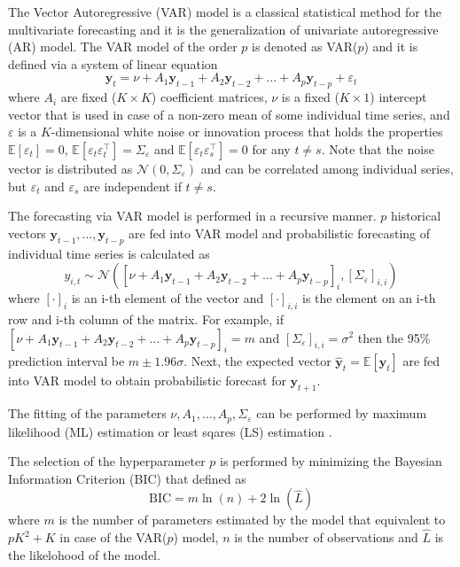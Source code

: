 \documentclass[12pt,a4paper]{article}
\begin{document}
The Vector Autoregressive (VAR) model is a classical statistical method for the multivariate forecasting \cite{mts2007} and it is the generalization of univariate autoregressive (AR) model. The VAR model of the order $p$ is denoted as VAR($p$) and it is defined via a system of linear equation
$$\mathbf y_{t} = \nu + A_1 \mathbf y_{t-1} + A_2 \mathbf y_{t-2} + \dots + A_p \mathbf y_{t-p} + \varepsilon_t$$
where $A_i$ are fixed ($K\times K$) coefficient matrices, $\nu$ is a fixed ($K \times 1$) intercept vector that is used in case of a non-zero mean of some individual time series, and $\varepsilon$ is a $K$-dimensional white noise or innovation process that holds the properties $\mathbb E [\varepsilon_t] = 0$, $\mathbb E [\varepsilon_t \varepsilon_t^\top] = \Sigma_\varepsilon$ and $\mathbb E [\varepsilon_t \varepsilon_s^\top] = 0$ for any $t\neq s$. Note that the noise vector is distributed as $\mathcal N(0, \Sigma_\varepsilon)$ and can be correlated among individual series, but $\varepsilon_t$ and $\varepsilon_s$ are independent if $t \neq s$.

The forecasting via VAR model is performed in a recursive manner. $p$ historical vectors $\mathbf y_{t-1}, \dots, \mathbf y_{t-p}$ are fed into VAR model and probabilistic forecasting of individual time series is calculated as
$$y_{i, t} \sim \mathcal N([\nu + A_1 \mathbf y_{t-1} + A_2 \mathbf y_{t-2} + \dots + A_p \mathbf y_{t-p}]_i, [\Sigma_\varepsilon]_{i,i})$$
where $[\cdot]_i$ is an i-th element of the vector and $[\cdot]_{i,i}$ is the element on an i-th row and i-th column of the matrix. For example, if $[\nu + A_1 \mathbf y_{t-1} + A_2 \mathbf y_{t-2} + \dots + A_p \mathbf y_{t-p}]_i = m$ and $[\Sigma_\varepsilon]_{i,i} = \sigma^2$ then the 95\% prediction interval be $m \pm 1.96 \sigma$. Next, the expected  vector $\hat {\mathbf y}_t = \mathbb E [\mathbf y_t]$ are fed into VAR model to obtain probabilistic forecast for $\mathbf y_{t+1}$.

The fitting of the parameters $\nu, A_1, \dots, A_p, \Sigma_\varepsilon$ can be performed by maximum likelihood (ML) estimation or least sqares (LS) estimation \cite{mts2007}.

The selection of the hyperparameter $p$ is performed by minimizing the Bayesian Information Criterion (BIC) that defined as
$$\text{BIC} = m \ln (n) + 2 \ln (\hat L)$$
where $m$ is the number of parameters estimated by the model that equivalent to $pK^2 + K$ in case of the VAR($p$) model, $n$ is the number of observations and $\hat L$ is the likelohood of the model.
\end{document}
